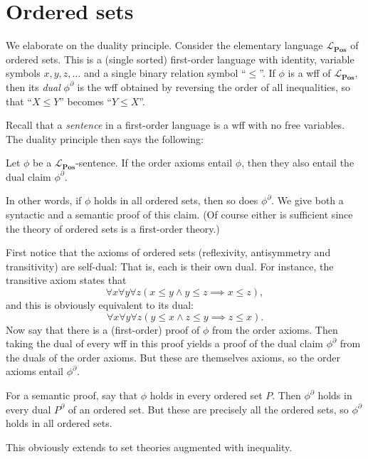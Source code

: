 \documentclass[article, a4paper, 11pt, oneside]{memoir}
\title{\doctitle}
\author{\docauthor}
\numberwithin{equation}{chapter}
\newcommand{\ncat}[1]{\mathbf{#1}} %
\theoremstyle{nonumberplain}
\newenvironment{displaytheorem}{%
	\begin{displayquote}\itshape%
}{%
	\end{displayquote}%
}
\begin{document}
\maketitle

\chapter{Ordered sets}

\newcommand{\catPos}{\ncat{Pos}}
\newcommand{\calL}{\mathcal{L}}
\newcommand{\dual}{^{\partial}}

\begin{remarkbreak}
    We elaborate on the duality principle. Consider the elementary language $\calL_\catPos$ of ordered sets. This is a (single sorted) first-order language with identity, variable symbols $x, y, z, \ldots$ and a single binary relation symbol \enquote{$\leq$}. If $\phi$ is a wff of $\calL_\catPos$, then its \emph{dual} $\phi\dual$ is the wff obtained by reversing the order of all inequalities, so that \enquote{$X \leq Y$} becomes \enquote{$Y \leq X$}.
    
    Recall that a \emph{sentence} in a first-order language is a wff with no free variables. The duality principle then says the following:
    \begin{displaytheorem}
        Let $\phi$ be a $\calL_\catPos$-sentence. If the order axioms entail $\phi$, then they also entail the dual claim $\phi\dual$.
    \end{displaytheorem}
    In other words, if $\phi$ holds in all ordered sets, then so does $\phi\dual$. We give both a syntactic and a semantic proof of this claim. (Of course either is sufficient since the theory of ordered sets is a first-order theory.)

    First notice that the axioms of ordered sets (reflexivity, antisymmetry and transitivity) are self-dual: That is, each is their own dual. For instance, the transitive axiom states that
    \begin{equation*}
        \forall x \forall y \forall z (x \leq y \land y \leq z \implies x \leq z),
    \end{equation*}
    and this is obviously equivalent to its dual:
    \begin{equation*}
        \forall x \forall y \forall z (y \leq x \land z \leq y \implies z \leq x).
    \end{equation*}
    Now say that there is a (first-order) proof of $\phi$ from the order axioms. Then taking the dual of every wff in this proof yields a proof of the dual claim $\phi\dual$ from the duals of the order axioms. But these are themselves axioms, so the order axioms entail $\phi\dual$.

    For a semantic proof, say that $\phi$ holds in every ordered set $P$. Then $\phi\dual$ holds in every dual $P\dual$ of an ordered set. But these are precisely all the ordered sets, so $\phi\dual$ holds in all ordered sets.

    This obviously extends to set theories augmented with inequality.
\end{remarkbreak}
\end{document}
